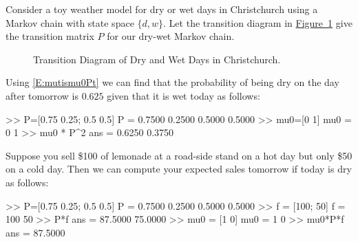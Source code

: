 \begin{example}\label{EX:DryWetChain}
Consider a toy weather model for dry or wet days in Christchurch using a Markov chain with state space $\{d,w\}$.  Let the transition diagram in \hyperref[F:DryWetTransDiag]{Figure~\ref*{F:DryWetTransDiag}} give the transition matrix $P$ for our dry-wet Markov chain.  
\begin{figure}[htpb]
\caption{Transition Diagram of Dry and Wet Days in Christchurch.\label{F:DryWetTransDiag}}
\centering   {}
\end{figure}
Using \eqref{E:mutismu0Pt} we can find that the probability of being dry on the day after tomorrow is $0.625$ given that it is wet today as follows:
\begin{VrbM}
>> P=[0.75 0.25; 0.5 0.5] %
P =
    0.7500    0.2500
    0.5000    0.5000
>> mu0=[0 1] %
mu0 =     0     1
>> mu0 * P^2 %
ans =    0.6250    0.3750
\end{VrbM}
Suppose you sell \$100 of lemonade at a road-side stand on a hot day but only \$50 on a cold day.  Then we can compute your expected sales tomorrow if today is dry as follows:
\begin{VrbM}
>> P=[0.75 0.25; 0.5 0.5] %
P =
    0.7500    0.2500
    0.5000    0.5000
>> f = [100; 50] %
f =
   100
    50
>> P*f %
ans =
   87.5000
   75.0000 
>> mu0 = [1 0] %
mu0 =     1     0
>> mu0*P*f %
ans =   87.5000
\end{VrbM}
\end{example}

